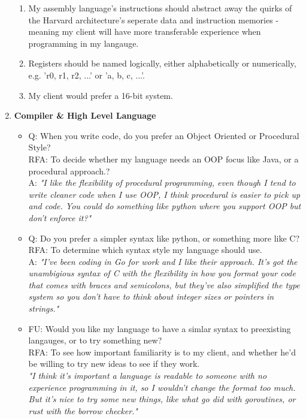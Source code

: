 \begin{enumerate}
\begin{enumerate}
            \item My assembly language's instructions should abstract away the quirks of the Harvard architecture's seperate data and instruction memories - meaning my client will have more transferable experience when programming in my langauge.
            \item Registers should be named logically, either  alphabetically or numerically, e.g. 'r0, r1, r2, ...' or 'a, b, c, ...'.
            \item My client would prefer a 16-bit system.
        \end{enumerate}
    \item \textbf{Compiler \& High Level Language}
        \begin{itemize}
            \item Q: When you write code, do you prefer an Object Oriented or Procedural Style? \\
                RFA: To decide whether my language needs an OOP focus like Java, or a procedural approach.?\\
                A: \textit{"I like the flexibility of procedural programming, even though I tend to write cleaner code when I use OOP, I think procedural is easier to pick up and code. You could do something like python where you support OOP but don't enforce it?"}
            \item Q: Do you prefer a simpler syntax like python, or something more like C? \\
                RFA: To determine which syntax style my language should use.\\
                A: \textit{"I've been coding in Go for work and I like their approach. It's got the unambigious syntax of C with the flexibility in how you format your code that comes with braces and semicolons, but they've also simplified the type system so you don't have to think about integer sizes or pointers in strings."}
            \item FU: Would you like my language to have a simlar syntax to preexisting langauges, or to try something new? \\
                RFA: To see how important familiarity is to my client, and whether he'd be willing to try new ideas to see if they work.\\
                \textit{"I think it's important a language is readable to someone with no experience programming in it, so I wouldn't change the format too much. But it's nice to try some new things, like what go did with goroutines, or rust with the borrow checker."}

\end{itemize}
\end{enumerate}
